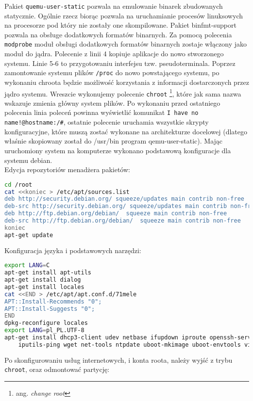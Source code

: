 Pakiet \lstinline{quemu-user-static} pozwala na emulowanie binarek zbudowanych statycznie. Ogólnie rzecz biorąc pozwala na uruchamianie procesów linuksowych na procesorze pod który nie zostały one skompilowane. Pakiet binfmt-support pozwala na obsługe dodatkowych formatów binarnych. Za pomocą polecenia \lstinline{modprobe} moduł obsługi dodatkowych formatów binarnych zostaje włączony jako moduł do jądra. Polecenie z linii 4 kopiuje aplikacje do nowo stworzonego systemu. Linie 5-6 to przygotowaniu interfejsu tzw. pseudoterminala. Poprzez zamontowanie systemu plików \lstinline{/proc} do nowo powstającego systemu, po wykonaniu chroota będzie możliwość korzystania z informacji dostarczonych przez jądro systemu. Wreszcie wykonujemy polecenie \lstinline{chroot} \footnote{ang. \emph{change root}}, które jak sama nazwa wskazuje zmienia główny system plików. Po wykonaniu przed ostatniego polecenia linia poleceń powinna wyświetlić komunikat \lstinline{I have no name!@hostname:/#}, ostatnie polecenie uruchamia wszystkie skrypty konfiguracyjne, które muszą zostać wykonane na architekturze docelowej (dlatego właśnie skopiowany został do /usr/bin program qemu-user-static). Mając uruchomiony system na komputerze wykonano podstawową konfiguracje dla systemu debian.
\\
Edycja repozytoriów menadżera pakietów:
\begin{lstlisting}[language=bash]
cd /root
cat <<koniec > /etc/apt/sources.list
deb http://security.debian.org/ squeeze/updates main contrib non-free
deb-src http://security.debian.org/ squeeze/updates main contrib non-free
deb http://ftp.debian.org/debian/  squeeze main contrib non-free
deb-src http://ftp.debian.org/debian/  squeeze main contrib non-free
koniec
apt-get update
\end{lstlisting}

Konfiguracja języka i podstawowych narzędzi:
\begin{lstlisting}[language=bash]
export LANG=C
apt-get install apt-utils
apt-get install dialog
apt-get install locales
cat <<END > /etc/apt/apt.conf.d/71mele
APT::Install-Recommends "0";
APT::Install-Suggests "0";
END
dpkg-reconfigure locales
export LANG=pl_PL.UTF-8
apt-get install dhcp3-client udev netbase ifupdown iproute openssh-server \
    iputils-ping wget net-tools ntpdate uboot-mkimage uboot-envtools vim nano less X
\end{lstlisting}

Po skonfigurowaniu usług internetowych, i konta roota, należy wyjść z trybu \lstinline{chroot}, oraz odmontować partycję:

